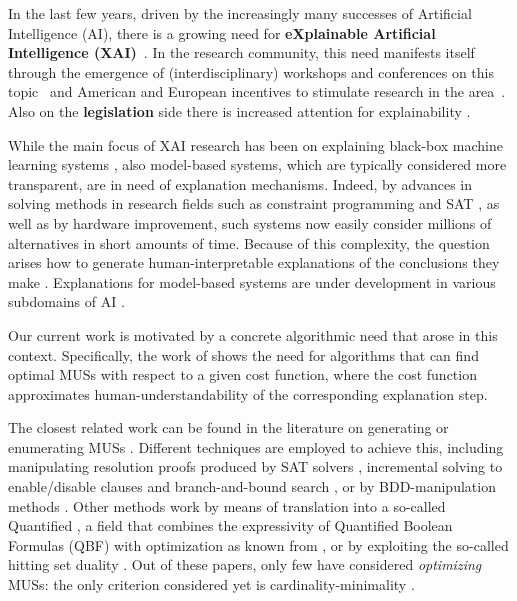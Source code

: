 
In the last few years, driven by the increasingly many successes of Artificial Intelligence (AI), there is a growing need for \textbf{eXplainable Artificial Intelligence (XAI)}~\cite{miller2019explanation}.
In the research community, this need manifests itself through the emergence of (interdisciplinary) workshops and conferences on this topic~\cite{xai-ijcai,FAT} and American and European incentives to stimulate research in the area~\cite{gunning2017explainable,hamonrobustness,chistera,fetproact}. 
Also on the \textbf{legislation} side there is increased attention for explainability \cite{regulation2016regulation}.

While the main focus of XAI research has been on explaining black-box machine learning systems \cite{Barredo_Arrieta_2020,Adadi_2018}, also model-based systems, which are typically considered more transparent, are in need of explanation mechanisms. 
Indeed, by advances in solving methods in research fields such as constraint programming \cite{CP} and SAT \cite{DBLP:series/faia/2009-185}, as well as by hardware improvement, such systems now easily consider millions of alternatives in short amounts of time. 
Because of this complexity, the question arises how to generate human-interpretable explanations of the conclusions they make  \cite{DBLP:conf/dsaa/GilpinBYBSK18}. 
Explanations for model-based systems are under development in various subdomains of AI \cite{junker2001quickxplain,fox2017explainable,vcyras2019argumentation,chakraborti2017plan,winston2004operations,putnam2019toward}.

Our current work is motivated by a concrete algorithmic need that arose in this context. 
Specifically, the work of \citet{ecai/BogaertsGCG20} shows the need for algorithms that can find optimal MUSs with respect to a given cost function, where the cost function approximates human-understandability of the corresponding explanation step.

The closest related work can be found in the literature on generating or enumerating MUSs \cite{conf/sat/LynceM04}.
Different techniques are employed to achieve this, including  manipulating resolution proofs produced by SAT solvers \cite{goldberg,DBLP:journals/fmsd/GershmanKS08,DBLP:conf/sat/DershowitzHN06}, incremental solving to enable/disable clauses and branch-and-bound search \cite{DBLP:conf/dac/OhMASM04}, or by BDD-manipulation methods \cite{huang}.
Other methods work by means of translation into a so-called Quantified \maxsat \cite{DBLP:journals/constraints/IgnatievJM16}, a field that combines the expressivity of Quantified Boolean Formulas (QBF)  with optimization as known from \maxsat {}, or by exploiting the so-called hitting set duality \cite{ignatiev2015smallest}. 
Out of these papers, only few have considered \emph{optimizing} MUSs: the only criterion considered yet is cardinality-minimality \cite{conf/sat/LynceM04,ignatiev2015smallest}. 

